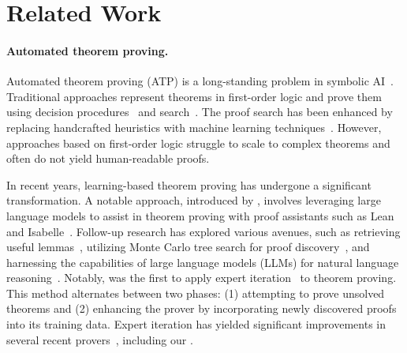 \section{Related Work}


\paragraph{Automated theorem proving.} 
Automated theorem proving (ATP) is a long-standing problem in symbolic AI~\citep{robinson2001handbook}. Traditional approaches represent theorems in first-order logic and prove them using decision procedures~\citep{de2008z3,barbosa2022cvc5} and search~\citep{kovacs2013first,schulz2019faster}. The proof search has been enhanced by replacing handcrafted heuristics with machine learning techniques~\citep{urban2011malecop,kaliszyk2018reinforcement}. However, approaches based on first-order logic struggle to scale to complex theorems and often do not yield human-readable proofs.



In recent years, learning-based theorem proving has undergone a significant transformation. A notable approach, introduced by \citet{polu2020generative}, involves leveraging large language models to assist in theorem proving with proof assistants such as Lean~\citep{de2015lean, moura2021lean} and Isabelle~\citep{paulson1994isabelle}. Follow-up research has explored various avenues, such as retrieving useful lemmas~\citep{irving2016deepmath,mikula2024magnushammer,yang2024leandojo}, utilizing Monte Carlo tree search for proof discovery~\citep{lample2022hypertree}, and harnessing the capabilities of large language models (LLMs) for natural language reasoning~\citep{jiang2022draft,lin2024lean}. Notably, \cite{polu2023formal} was the first to apply expert iteration~\citep{anthony2017thinking} to theorem proving. This method alternates between two phases: (1) attempting to prove unsolved theorems and (2) enhancing the prover by incorporating newly discovered proofs into its training data. Expert iteration has yielded significant improvements in several recent provers~\citep{wu2024internlm2,xin2024deepseekv15}, including our {\prover}. 

